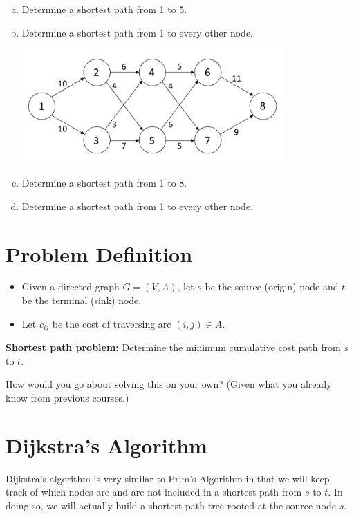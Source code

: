 \documentclass[12pt]{article}
\theoremstyle{definition}
\begin{document}
\begin{enumerate}[a.]

\item Determine a shortest path from 1 to 5.
\vfill
\item Determine a shortest path from 1 to every other node.
\vfill

\newpage
\begin{center}
\includegraphics[width=10cm]{shortestpathexample2}
\end{center}

\item Determine a shortest path from 1 to 8.
\vfill
\item Determine a shortest path from 1 to every other node.
\vfill


\end{enumerate}

\newpage


\section{Problem Definition}

\begin{itemize}
\item Given a directed graph $G=(V,A)$, let $s$ be the source (origin) node and $t$ be the terminal (sink) node. 
\item Let $c_{ij}$ be the cost of traversing arc $(i,j) \in A$.
\end{itemize}

\textbf{Shortest path problem:} Determine the minimum cumulative cost path from $s$ to $t$.


How would you go about solving this on your own? (Given what you already know from previous courses.)

\vfill

\section{Dijkstra's Algorithm}

Dijkstra's algorithm is very similar to Prim's Algorithm in that we will keep track of which nodes are and are not included in a shortest path from $s$ to $t$. In doing so, we will actually build a shortest-path tree rooted at the source node $s$.
\end{document}
